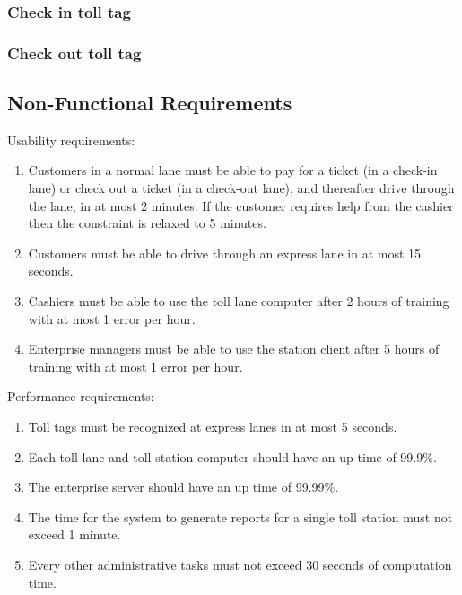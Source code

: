 \subsubsection{Check in toll tag}

\subsubsection{Check out toll tag}





\subsection{Non-Functional Requirements}
Usability requirements:
\begin{enumerate}
\item Customers in a normal lane must be able to pay for a ticket (in a check-in lane) or check out a ticket (in a check-out lane), and thereafter drive through the lane, in at most 2 minutes. If the customer requires help from the cashier then the constraint is relaxed to 5 minutes.
\item Customers must be able to drive through an express lane in at most 15 seconds.
\item Cashiers must be able to use the toll lane computer after 2 hours of training with at most 1 error per hour.
\item Enterprise managers must be able to use the station client after 5 hours of training with at most 1 error per hour.
\end{enumerate}


Performance requirements:
\begin{enumerate}
\item Toll tags must be recognized at express lanes in at most 5 seconds.
\item Each toll lane and toll station computer should have an up time of 99.9\%.
\item The enterprise server should have an up time of 99.99\%.
\item The time for the system to generate reports for a single toll station must not exceed 1 minute.
\item Every other administrative tasks must not exceed 30 seconds of computation time.
\end{enumerate}